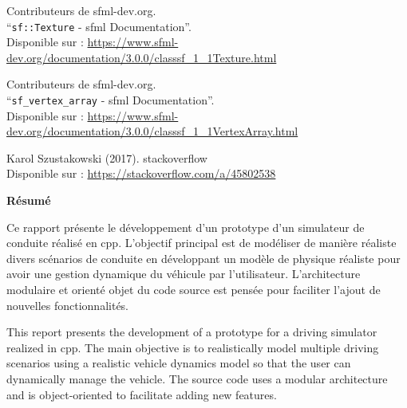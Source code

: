 \documentclass[a4paper,12pt]{report}
\begin{document}
\begin{thebibliography}{9}
        Contributeurs de sfml-dev.org.\\
        ``\texttt{sf::Texture} - \gls{sfml} Documentation''.\\
        Disponible sur : \url{https://www.sfml-dev.org/documentation/3.0.0/classsf_1_1Texture.html}

        Contributeurs de sfml-dev.org.\\
        ``\texttt{\gls{sf_vertex_array}} - \gls{sfml} Documentation''.\\
        Disponible sur : \url{https://www.sfml-dev.org/documentation/3.0.0/classsf_1_1VertexArray.html}

        Karol Szustakowski (2017).
        \gls{stackoverflow} \\
        Disponible sur : \url{https://stackoverflow.com/a/45802538}
    \end{thebibliography}

    \clearpage
    \vspace*{\fill}
    \begin{center}
    {\Large \textbf{Résumé}}
    \end{center}
    \bigskip
    \noindent
    \begin{minipage}{\textwidth}
        Ce rapport présente le développement d'un prototype d'un simulateur de conduite réalisé en \gls{cpp}.
        L'objectif principal est de modéliser de manière réaliste divers scénarios de conduite en développant un modèle de physique réaliste pour avoir une gestion dynamique du véhicule par l'utilisateur.
        L'architecture modulaire et orienté objet du code source est pensée pour faciliter l'ajout de nouvelles fonctionnalités.

        \bigskip

        This report presents the development of a prototype for a driving simulator realized in \gls{cpp}.
        The main objective is to realistically model multiple driving scenarios using a realistic vehicle dynamics model so that the user can dynamically manage the vehicle.
        The source code uses a modular architecture and is object-oriented to facilitate adding new features.
    \end{minipage}
    \vspace*{\fill} %
    \clearpage
\end{document}
